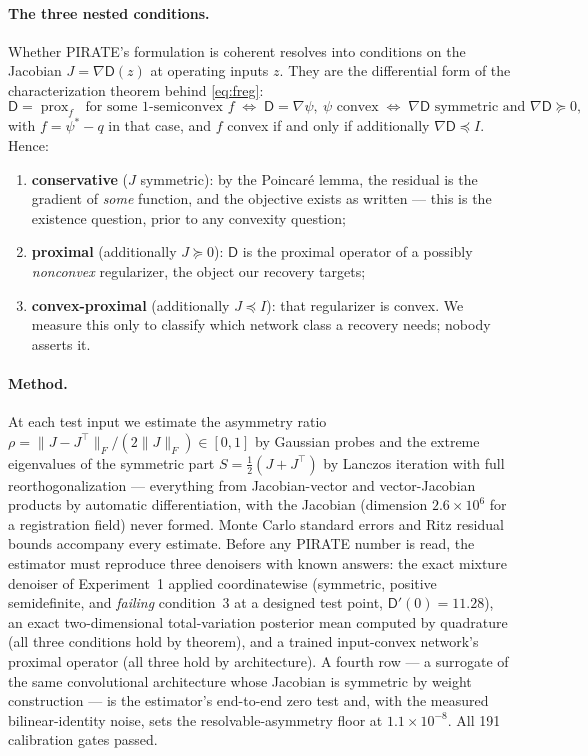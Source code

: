 \documentclass[11pt]{article}
\newcommand{\D}{\mathsf{D}}
\newcommand{\prox}{\operatorname{prox}}
\begin{document}
\paragraph{The three nested conditions.} Whether PIRATE's formulation is coherent resolves into conditions on the Jacobian $J = \nabla\D(z)$ at operating inputs $z$. They are the differential form of the characterization theorem behind \eqref{eq:freg}:
\begin{equation}
\D = \prox_{f} \ \text{ for some $1$-semiconvex } f
\;\Longleftrightarrow\;
\D = \nabla\psi, \ \psi \text{ convex}
\;\Longleftrightarrow\;
\nabla\D \text{ symmetric and } \nabla\D \succeq 0,
\label{eq:charprox}
\end{equation}
with $f = \psi^* - q$ in that case, and $f$ convex if and only if additionally $\nabla\D \preceq I$. Hence:
\begin{enumerate}
\item \textbf{conservative} ($J$ symmetric): by the Poincar\'e lemma, the residual is the gradient of \emph{some} function, and the objective exists as written --- this is the existence question, prior to any convexity question;
\item \textbf{proximal} (additionally $J \succeq 0$): $\D$ is the proximal operator of a possibly \emph{nonconvex} regularizer, the object our recovery targets;
\item \textbf{convex-proximal} (additionally $J \preceq I$): that regularizer is convex. We measure this only to classify which network class a recovery needs; nobody asserts it.
\end{enumerate}

\paragraph{Method.} At each test input we estimate the asymmetry ratio $\rho = \|J - J^\top\|_F / (2\|J\|_F) \in [0,1]$ by Gaussian probes and the extreme eigenvalues of the symmetric part $S = \tfrac12(J + J^\top)$ by Lanczos iteration with full reorthogonalization --- everything from Jacobian-vector and vector-Jacobian products by automatic differentiation, with the Jacobian (dimension $2.6 \times 10^6$ for a registration field) never formed. Monte Carlo standard errors and Ritz residual bounds accompany every estimate. Before any PIRATE number is read, the estimator must reproduce three denoisers with known answers: the exact mixture denoiser of Experiment~1 applied coordinatewise (symmetric, positive semidefinite, and \emph{failing} condition~3 at a designed test point, $\D'(0) = 11.28$), an exact two-dimensional total-variation posterior mean computed by quadrature (all three conditions hold by theorem), and a trained input-convex network's proximal operator (all three hold by architecture). A fourth row --- a surrogate of the same convolutional architecture whose Jacobian is symmetric by weight construction --- is the estimator's end-to-end zero test and, with the measured bilinear-identity noise, sets the resolvable-asymmetry floor at $1.1 \times 10^{-8}$. All 191 calibration gates passed.
\end{document}
